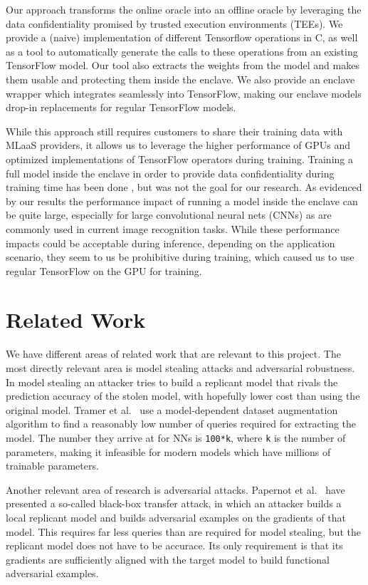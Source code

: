 \documentclass[11pt]{article}
\newcommand{\tf}{TensorFlow}
\begin{document}
Our approach transforms the online oracle into an offline oracle by leveraging the data confidentiality promised by trusted execution environments (TEEs).
We provide a (naive) implementation of different Tensorflow operations in C, as well as a tool to automatically generate the calls to these operations from an existing \tf{} model.
Our tool also extracts the weights from the model and makes them usable and protecting them inside the enclave.
We also provide an enclave wrapper which integrates seamlessly into \tf{}, making our enclave models drop-in replacements for regular \tf{} models.

While this approach still requires customers to share their training data with MLaaS providers, it allows us to leverage the higher performance of GPUs and optimized implementations of \tf{} operators during training.
Training a full model inside the enclave in order to provide data confidentiality during training time has been done \cite{ohrimenko_oblivious_2016}, but was not the goal for our research.
As evidenced by our results the performance impact of running a model inside the enclave can be quite large, especially for large convolutional neural nets (CNNs) as are commonly used in current image recognition tasks.
While these performance impacts could be acceptable during inference, depending on the application scenario, they seem to us be prohibitive during training, which caused us to use regular \tf{} on the GPU for training.

\section{Related Work}
\label{sec:related}

We have different areas of related work that are relevant to this project.
The most directly relevant area is model stealing attacks and adversarial robustness.
In model stealing an attacker tries to build a replicant model that rivals the prediction accuracy of the stolen model, with hopefully lower cost than using the original model.
Tramer et al.~\cite{tramer_stealing_2016} use a model-dependent dataset augmentation algorithm to find a reasonably low number of queries required for extracting the model.
The number they arrive at for NNs is \texttt{100*k}, where \texttt{k} is the number of parameters, making it infeasible for modern models which have millions of trainable parameters.

Another relevant area of research is adversarial attacks.
Papernot et al.~\cite{papernot_practical_2017} have presented a so-called black-box transfer attack, in which an attacker builds a local replicant model and builds adversarial examples on the gradients of that model.
This requires far less queries than are required for model stealing, but the replicant model does not have to be accurace.
Its only requirement is that its gradients are sufficiently aligned with the target model to build functional adversarial examples.
\end{document}
